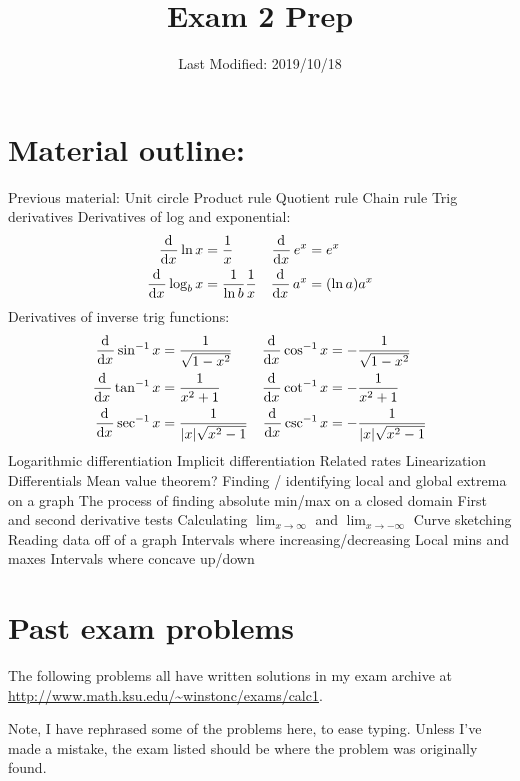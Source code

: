 \documentclass[10pt]{scrartcl}
\title{Exam 2 Prep}
\date{Last Modified: 2019/10/18}
\author{}
\newcommand{\inv}{^{-1}}
\begin{document}
\maketitle
\tableofcontents


\section{Material outline:}
\begin{outline}
  \1 Previous material:
  \2 Unit circle
  \2 Product rule
  \2 Quotient rule
  \2 Chain rule
  \2 Trig derivatives
  \1 Derivatives of log and exponential:
  \begin{align*}
    \dod{}{x} \ln x &= \frac 1x & \dod{}{x} e^x &= e^x\\
    \dod{}{x} \log_b x &= \frac{1}{\ln b} \frac 1x & \dod{}{x} a^x &= (\ln a) a^x
  \end{align*}
  \1 Derivatives of inverse trig functions:
  \begin{align*}
    \dod{}{x} \sin\inv x &= \frac{1}{\sqrt{1 - x^2}} & \dod{}{x} \cos\inv x &= -\frac{1}{\sqrt{1 - x^2}} \\
    \dod{}{x} \tan\inv x &= \frac{1}{x^2 + 1} & \dod{}{x} \cot\inv x &= -\frac{1}{x^2 + 1}\\
    \dod{}{x} \sec\inv x &= \frac{1}{|x|\sqrt{x^2 - 1}} & \dod{}{x} \csc\inv x &= -\frac{1}{|x|\sqrt{x^2 - 1}}
  \end{align*}
  \1 Logarithmic differentiation
  \1 Implicit differentiation
  \1 Related rates
  \1 Linearization
  \1 Differentials
  \1 Mean value theorem?
  \1 Finding / identifying local and global extrema on a graph
  \1 The process of finding absolute min/max on a closed domain
  \1 First and second derivative tests
  \1 Calculating $\lim_{x\to\infty}$ and $\lim_{x\to-\infty}$
  \1 Curve sketching
  \1 Reading data off of a graph
  \2 Intervals where increasing/decreasing
  \2 Local mins and maxes
  \2 Intervals where concave up/down
\end{outline}

\section{Past exam problems}
The following problems all have written solutions in my exam archive at \url{http://www.math.ksu.edu/\~winstonc/exams/calc1}.

Note, I have rephrased some of the problems here, to ease typing. 
Unless I've made a mistake, the exam listed should be where the problem was originally found.
\end{document}
